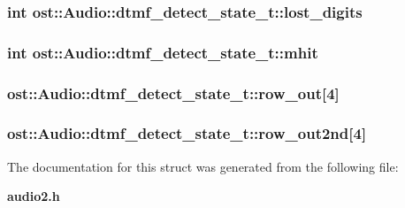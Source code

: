 \subsubsection[{lost\_\-digits}]{\setlength{\rightskip}{0pt plus 5cm}int {\bf ost::Audio::dtmf\_\-detect\_\-state\_\-t::lost\_\-digits}}\label{structost_1_1_audio_1_1dtmf__detect__state__t_a27b6231325ef5b3a5efe01412b133227}
\subsubsection[{mhit}]{\setlength{\rightskip}{0pt plus 5cm}int {\bf ost::Audio::dtmf\_\-detect\_\-state\_\-t::mhit}}\label{structost_1_1_audio_1_1dtmf__detect__state__t_a9d735037f661669d18cef627c197b67e}
\subsubsection[{row\_\-out}]{ {\bf ost::Audio::dtmf\_\-detect\_\-state\_\-t::row\_\-out}[4]}\label{structost_1_1_audio_1_1dtmf__detect__state__t_af21afb8422b17c34e0702783e4ca9362}
\subsubsection[{row\_\-out2nd}]{ {\bf ost::Audio::dtmf\_\-detect\_\-state\_\-t::row\_\-out2nd}[4]}\label{structost_1_1_audio_1_1dtmf__detect__state__t_a4f28bae9e4849c109353f1baa7ed4e43}


The documentation for this struct was generated from the following file:\begin{DoxyCompactItemize}
\item 
{\bf audio2.h}\end{DoxyCompactItemize}
